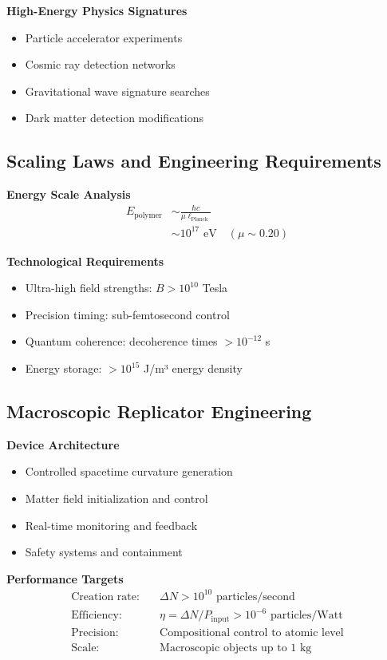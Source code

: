 \documentclass[11pt]{article}
\begin{document}
\textbf{High-Energy Physics Signatures}
\begin{itemize}
\item Particle accelerator experiments
\item Cosmic ray detection networks
\item Gravitational wave signature searches
\item Dark matter detection modifications
\end{itemize}

\subsection{Scaling Laws and Engineering Requirements}

\textbf{Energy Scale Analysis}
\begin{align}
E_{\text{polymer}} &\sim \frac{\hbar c}{\mu \ell_{\text{Planck}}} \\
&\sim 10^{17} \text{ eV} \quad (\mu \sim 0.20)
\end{align}

\textbf{Technological Requirements}
\begin{itemize}
\item Ultra-high field strengths: $B > 10^{10}$ Tesla
\item Precision timing: sub-femtosecond control
\item Quantum coherence: decoherence times $> 10^{-12}$ s
\item Energy storage: $> 10^{15}$ J/m³ energy density
\end{itemize}

\subsection{Macroscopic Replicator Engineering}

\textbf{Device Architecture}
\begin{itemize}
\item Controlled spacetime curvature generation
\item Matter field initialization and control
\item Real-time monitoring and feedback
\item Safety systems and containment
\end{itemize}

\textbf{Performance Targets}
\begin{align}
\text{Creation rate:} &\quad \Delta N > 10^{10} \text{ particles/second} \\
\text{Efficiency:} &\quad \eta = \Delta N / P_{\text{input}} > 10^{-6} \text{ particles/Watt} \\
\text{Precision:} &\quad \text{Compositional control to atomic level} \\
\text{Scale:} &\quad \text{Macroscopic objects up to 1 kg}
\end{align}
\end{document}
